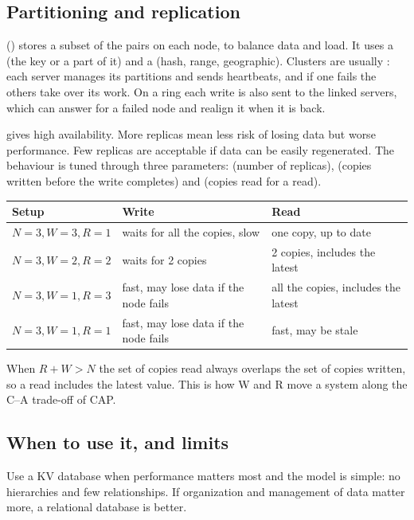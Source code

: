 \subsection{Partitioning and replication}
 () stores a subset of the pairs on each node, to balance data and load. It uses a  (the key or a part of it) and a  (hash, range, geographic). Clusters are usually : each server manages its partitions and sends heartbeats, and if one fails the others take over its work. On a ring each write is also sent to the linked servers, which can answer for a failed node and realign it when it is back.

 gives high availability. More replicas mean less risk of losing data but worse performance. Few replicas are acceptable if data can be easily regenerated. The behaviour is tuned through three parameters:  (number of replicas),  (copies written before the write completes) and  (copies read for a read).

\begin{center}\small
\begin{tabular}{lll}
\toprule
\textbf{Setup} & \textbf{Write} & \textbf{Read} \\
\midrule
$N{=}3, W{=}3, R{=}1$ & waits for all the copies, slow & one copy, up to date \\
$N{=}3, W{=}2, R{=}2$ & waits for 2 copies & 2 copies, includes the latest \\
$N{=}3, W{=}1, R{=}3$ & fast, may lose data if the node fails & all the copies, includes the latest \\
$N{=}3, W{=}1, R{=}1$ & fast, may lose data if the node fails & fast, may be stale \\
\bottomrule
\end{tabular}
\end{center}

\begin{remark}
When $R + W > N$ the set of copies read always overlaps the set of copies written, so a read includes the latest value. This is how W and R move a system along the C--A trade-off of CAP.
\end{remark}

\subsection{When to use it, and limits}
Use a KV database when performance matters most and the model is simple: no hierarchies and few relationships. If organization and management of data matter more, a relational database is better.

